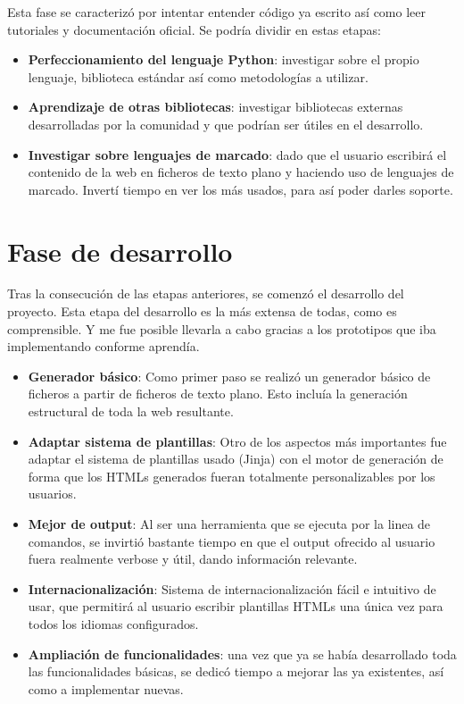 Esta fase se caracterizó por intentar entender código ya escrito así como leer tutoriales y documentación
oficial. Se podría dividir en estas etapas:

\begin{itemize}
\item \textbf{Perfeccionamiento del lenguaje Python}: investigar sobre el propio lenguaje, biblioteca estándar
así como metodologías a utilizar.
\item \textbf{Aprendizaje de otras bibliotecas}: investigar bibliotecas externas desarrolladas por la comunidad y
que podrían ser útiles en el desarrollo.
\item \textbf{Investigar sobre lenguajes de marcado}: dado que el usuario escribirá el contenido de la web en ficheros
de texto plano y haciendo uso de lenguajes de marcado. Invertí tiempo en ver los más usados, para así poder
darles soporte.
\end{itemize}

\section{Fase de desarrollo}

Tras la consecución de las etapas anteriores, se comenzó el desarrollo del proyecto. Esta etapa del desarrollo 
es la más extensa de todas, como es comprensible. Y me fue posible llevarla a cabo gracias a los
prototipos que iba implementando conforme aprendía.

\begin{itemize}
\item \textbf{Generador básico}: Como primer paso se realizó un generador básico de ficheros a partir 
de ficheros de texto plano. Esto incluía la generación estructural de toda la web resultante.
\item \textbf{Adaptar sistema de plantillas}: Otro de los aspectos más importantes fue adaptar el sistema 
de plantillas usado (Jinja) con el motor de generación de forma que los HTMLs generados fueran totalmente
personalizables por los usuarios.
\item \textbf{Mejor de output}: Al ser una herramienta que se ejecuta por la linea de comandos, se invirtió
bastante tiempo en que el output ofrecido al usuario fuera realmente verbose y útil, dando información relevante.
\item \textbf{Internacionalización}: Sistema de internacionalización fácil e intuitivo de usar, que permitirá al usuario
escribir plantillas HTMLs una única vez para todos los idiomas configurados.
\item \textbf{Ampliación de funcionalidades}: una vez que ya se había desarrollado toda las funcionalidades básicas,
se dedicó tiempo a mejorar las ya existentes, así como a implementar nuevas.
\end{itemize}


